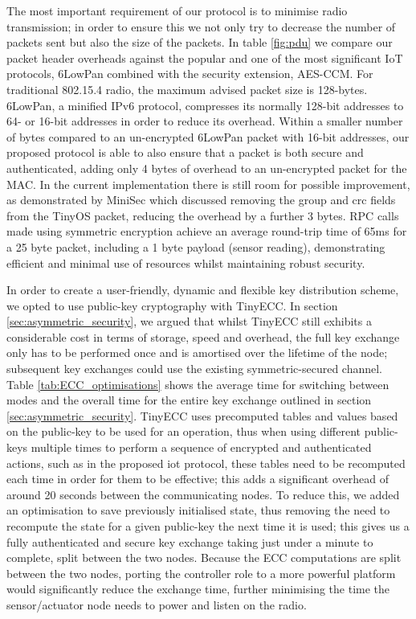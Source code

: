 \documentclass[conference]{./sty/IEEEtran}
\begin{document}
The most important requirement of our protocol is to minimise radio transmission; in order to ensure this we not only try to decrease the number of packets sent but also the size of the packets. In table \ref{fig:pdu} we compare our packet header overheads against the popular and one of the most significant IoT protocols, 6LowPan combined with the security extension, AES-CCM. For traditional 802.15.4 radio, the maximum advised packet size is 128-bytes. 6LowPan, a minified IPv6 protocol, compresses its normally 128-bit addresses to 64- or 16-bit addresses in order to reduce its overhead. Within a smaller number of bytes compared to an un-encrypted 6LowPan packet with 16-bit addresses, our proposed protocol is able to also ensure that a packet is both secure and authenticated, adding only 4 bytes of overhead to an un-encrypted packet for the MAC. In the current implementation there is still room for possible improvement, as demonstrated by MiniSec which discussed removing the group and crc fields from the TinyOS packet, reducing the overhead by a further 3 bytes. RPC calls made using symmetric encryption achieve an average round-trip time of 65ms for a 25 byte packet, including a 1 byte payload (sensor reading), demonstrating efficient and minimal use of resources whilst maintaining robust security.

In order to create a user-friendly, dynamic and flexible key distribution scheme, we opted to use public-key cryptography with TinyECC. In section \ref{sec:asymmetric_security}, we argued that whilst TinyECC still exhibits a considerable cost in terms of storage, speed and overhead, the full key exchange only has to be performed once and is amortised over the lifetime of the node; subsequent key exchanges could use the existing symmetric-secured channel. Table \ref{tab:ECC_optimisations} shows the average time for switching between modes and the overall time for the entire key exchange outlined in section \ref{sec:asymmetric_security}. TinyECC uses precomputed tables and values based on the public-key to be used for an operation, thus when using different public-keys multiple times to perform a sequence of encrypted and authenticated actions, such as in the proposed iot protocol, these tables need to be recomputed each time in order for them to be effective; this adds a significant overhead of around 20 seconds between the communicating nodes. To reduce this, we added an optimisation to save previously initialised state, thus removing the need to recompute the state for a given public-key the next time it is used; this gives us a fully authenticated and secure key exchange taking just under a minute to complete, split between the two nodes. Because the ECC computations are split between the two nodes, porting the controller role to a more powerful platform would significantly reduce the exchange time, further minimising the time the sensor/actuator node needs to power and listen on the radio. 
\end{document}
